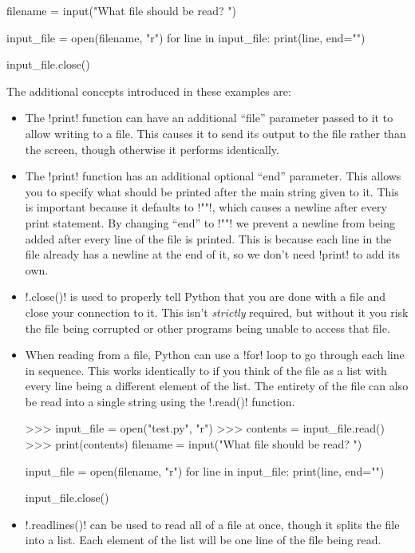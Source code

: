 \documentclass[11pt]{cselabheader}
\begin{document}
\begin{python3code}
filename = input("What file should be read? ")

input_file = open(filename, "r")
for line in input_file:
  print(line, end="")

input_file.close()
\end{python3code}

The additional concepts introduced in these examples are:

\begin{itemize}
\item The \pythoninline!print! function can have an additional ``file'' parameter
  passed to it to allow writing to a file. This causes it to send its output to
  the file rather than the screen, though otherwise it performs identically.

\item The \pythoninline!print! function has an additional optional ``end''
  parameter. This allows you to specify what should be printed after the main
  string given to it. This is important because it defaults to \pythoninline!"\n"!,
  which causes a newline after every print statement. By changing ``end'' to
  \pythoninline!""! we prevent a newline from being added after every line of the
  file is printed. This is because each line in the file already has a newline
  at the end of it, so we don't need \pythoninline!print! to add its own.

\item \pythoninline!.close()! is used to properly tell Python that you are done
  with a file and close your connection to it. This isn't \emph{strictly}
  required, but without it you risk the file being corrupted or other programs
  being unable to access that file.

\item When reading from a file, Python can use a \pythoninline!for! loop to go
  through each line in sequence. This works identically to if you think of the
  file as a list with every line being a different element of the list. The
  entirety of the file can also be read into a single string using the
  \pythoninline!.read()! function.

\begin{pyconcode}
>>> input_file = open("test.py", "r")
>>> contents = input_file.read()
>>> print(contents)
filename = input("What file should be read? ")

input_file = open(filename, "r")
for line in input_file:
  print(line, end="")

input_file.close()
\end{pyconcode}

\item \pythoninline!.readlines()! can be used to read all of a file at once, though
  it splits the file into a list. Each element of the list will be one line of
  the file being read.
\end{itemize}
\end{document}
